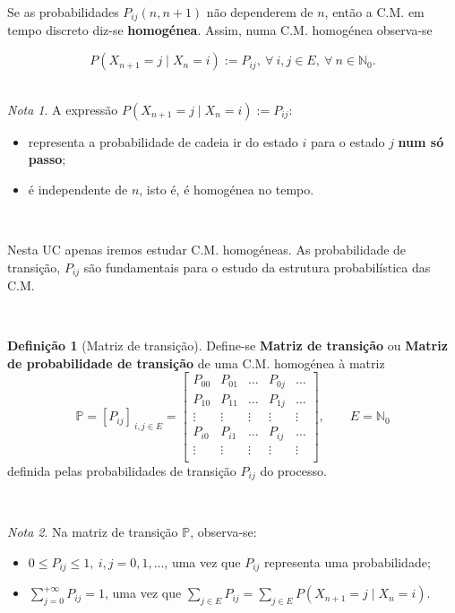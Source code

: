 \documentclass[
  11pt,
  a4paper,
]{book}
\theoremstyle{definition}
\newtheorem{definition}{Definição}[chapter]
\theoremstyle{definition}
\theoremstyle{definition}
\theoremstyle{definition}
\theoremstyle{remark}
\newtheorem*{remark}{Nota }
\begin{document}
Se as probabilidades \(P_{ij}(n,n+1)\) não dependerem de \(n\), então a C.M. em tempo discreto diz-se \textbf{homogénea}. Assim, numa C.M. homogénea observa-se

\[P(X_{n+1}=j \mid X_n=i):=P_{ij},~\forall ~i,j \in E, ~\forall ~n \in \mathbb{N}_0.\]
\(\,\)

\begin{remark}

A expressão \(P(X_{n+1}=j \mid X_n=i):=P_{ij}\):

\begin{itemize}
\item
  representa a probabilidade de cadeia ir do estado \(i\) para o estado \(j\) \textbf{num só passo};
\item
  é independente de \(n\), isto é, é homogénea no tempo.
\end{itemize}

\end{remark}

\(\,\)

Nesta UC apenas iremos estudar C.M. homogéneas. As probabilidade de transição, \(P_{ij}\) são fundamentais para o estudo da estrutura probabilística das C.M.

\(\,\)

\begin{definition}[Matriz de transição]
Define-se \textbf{Matriz de transição} ou \textbf{Matriz de probabilidade de transição} de uma C.M. homogénea à matriz
\[\mathbb{P}=[P_{ij}]_{~i,j \in E}= \begin{bmatrix}
    P_{00} & P_{01} & \dots & P_{0j}  & \dots \\
    P_{10} & P_{11} & \dots & P_{1j}  & \dots \\
    \vdots & \vdots & \vdots & \vdots & \vdots \\
    P_{i0} & P_{i1} & \dots & P_{ij}  & \dots \\
    \vdots & \vdots & \vdots & \vdots & \vdots \\
\end{bmatrix}, \qquad E=\mathbb{N}_0\]
definida pelas probabilidades de transição \(P_{ij}\) do processo.
\end{definition}

\(\,\)

\begin{remark}

Na matriz de transição \(\mathbb{P}\), observa-se:

\begin{itemize}
\item
  \(0 \leq P_{ij} \leq 1, ~i,j=0,1,\ldots\), uma vez que \(P_{ij}\) representa uma probabilidade;
\item
  \(\sum\limits_{j=0}^{+\infty} P_{ij}=1\), uma vez que \(\sum\limits_{j \in E} P_{ij}=\sum\limits_{j \in E}P(X_{n+1}=j \mid X_n=i)\).
\end{itemize}

\end{remark}
\end{document}
